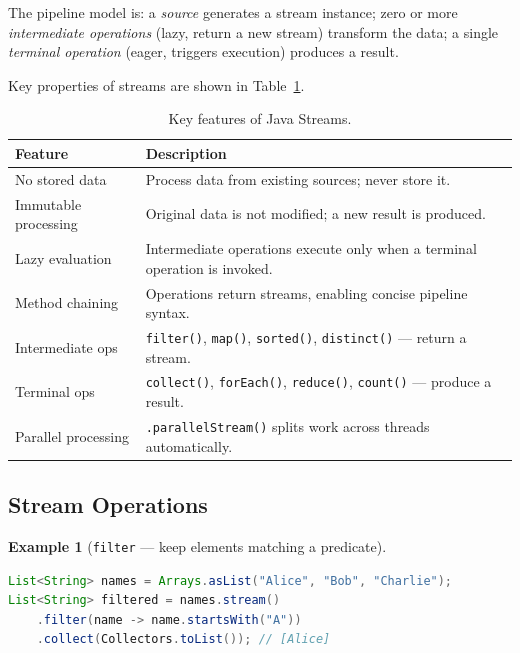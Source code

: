 \documentclass[11pt, a4paper, notitlepage]{report}
\theoremstyle{definition}
\theoremstyle{remark}
\theoremstyle{definition}
\newtheorem{example}[theorem]{Example}
\begin{document}
The pipeline model is: a \emph{source} generates a stream instance; zero or more
\emph{intermediate operations} (lazy, return a new stream) transform the data;
a single \emph{terminal operation} (eager, triggers execution) produces a result.

Key properties of streams are shown in Table~\ref{tab:ch10-stream-features}.

\begin{table}[h]
\centering
\begin{tabularx}{\linewidth}{lX}
\toprule
\textbf{Feature} & \textbf{Description} \\
\midrule
No stored data       & Process data from existing sources; never store it. \\
Immutable processing & Original data is not modified; a new result is produced. \\
Lazy evaluation      & Intermediate operations execute only when a terminal operation is invoked. \\
Method chaining      & Operations return streams, enabling concise pipeline syntax. \\
Intermediate ops     & \texttt{filter()}, \texttt{map()}, \texttt{sorted()}, \texttt{distinct()} --- return a stream. \\
Terminal ops         & \texttt{collect()}, \texttt{forEach()}, \texttt{reduce()}, \texttt{count()} --- produce a result. \\
Parallel processing  & \texttt{.parallelStream()} splits work across threads automatically. \\
\bottomrule
\end{tabularx}
\caption{Key features of Java Streams.}
\label{tab:ch10-stream-features}
\end{table}

\subsection{Stream Operations}
\label{subsec:ch10-stream-ops}

\begin{example}[\texttt{filter} --- keep elements matching a predicate]
\leavevmode
\begin{lstlisting}[language=Java]
List<String> names = Arrays.asList("Alice", "Bob", "Charlie");
List<String> filtered = names.stream()
    .filter(name -> name.startsWith("A"))
    .collect(Collectors.toList()); // [Alice]
\end{lstlisting}
\end{example}
\end{document}
